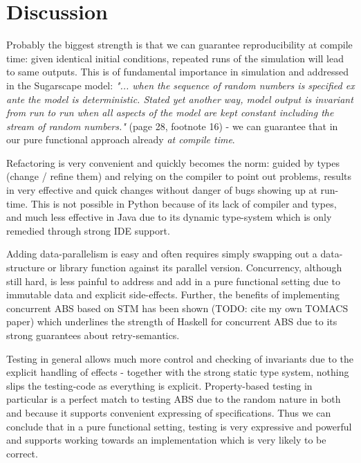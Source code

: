 \section{Discussion}
\label{sec:discussion}
Probably the biggest strength is that we can guarantee reproducibility at compile time: given identical initial conditions, repeated runs of the simulation will lead to same outputs. This is of fundamental importance in simulation and addressed in the Sugarscape model: \textit{"... when the sequence of random numbers is specified ex ante the model is deterministic. Stated yet another way, model output is invariant from run to run when all aspects of the model are kept constant including the stream of random numbers."} (page 28, footnote 16) - we can guarantee that in our pure functional approach already \textit{at compile time}.

Refactoring is very convenient and quickly becomes the norm: guided by types (change / refine them) and relying on the compiler to point out problems, results in very effective and quick changes without danger of bugs showing up at run-time. This is not possible in Python because of its lack of compiler and types, and much less effective in Java due to its dynamic type-system which is only remedied through strong IDE support.

Adding data-parallelism is easy and often requires simply swapping out a data-structure or library function against its parallel version. Concurrency, although still hard, is less painful to address and add in a pure functional setting due to immutable data and explicit side-effects. Further, the benefits of implementing concurrent ABS based on STM has been shown (TODO: cite my own TOMACS paper) which underlines the strength of Haskell for concurrent ABS due to its strong guarantees about retry-semantics.

Testing in general allows much more control and checking of invariants due to the explicit handling of effects - together with the strong static type system, nothing slips the testing-code as everything is explicit. Property-based testing in particular is a perfect match to testing ABS due to the random nature in both and because it supports convenient expressing of specifications. Thus we can conclude that in a pure functional setting, testing is very expressive and powerful and supports working towards an implementation which is very likely to be correct.

